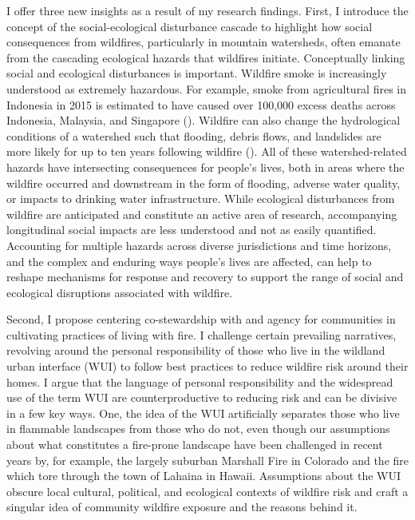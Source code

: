 \documentclass[
]{article}
\begin{document}
I offer three new insights as a result of my research findings. First, I introduce the concept of the social-ecological disturbance cascade to highlight how social consequences from wildfires, particularly in mountain watersheds, often emanate from the cascading ecological hazards that wildfires initiate. Conceptually linking social and ecological disturbances is important. Wildfire smoke is increasingly understood as extremely hazardous. For example, smoke from agricultural fires in Indonesia in 2015 is estimated to have caused over 100,000 excess deaths across Indonesia, Malaysia, and Singapore (). Wildfire can also change the hydrological conditions of a watershed such that flooding, debris flows, and landslides are more likely for up to ten years following wildfire (). All of these watershed-related hazards have intersecting consequences for people's lives, both in areas where the wildfire occurred and downstream in the form of flooding, adverse water quality, or impacts to drinking water infrastructure. While ecological disturbances from wildfire are anticipated and constitute an active area of research, accompanying longitudinal social impacts are less understood and not as easily quantified. Accounting for multiple hazards across diverse jurisdictions and time horizons, and the complex and enduring ways people's lives are affected, can help to reshape mechanisms for response and recovery to support the range of social and ecological disruptions associated with wildfire.

Second, I propose centering co-stewardship with and agency for communities in cultivating practices of living with fire. I challenge certain prevailing narratives, revolving around the personal responsibility of those who live in the wildland urban interface (WUI) to follow best practices to reduce wildfire risk around their homes. I argue that the language of personal responsibility and the widespread use of the term WUI are counterproductive to reducing risk and can be divisive in a few key ways. One, the idea of the WUI artificially separates those who live in flammable landscapes from those who do not, even though our assumptions about what constitutes a fire-prone landscape have been challenged in recent years by, for example, the largely suburban Marshall Fire in Colorado and the fire which tore through the town of Lahaina in Hawaii. Assumptions about the WUI obscure local cultural, political, and ecological contexts of wildfire risk and craft a singular idea of community wildfire exposure and the reasons behind it.
\end{document}
